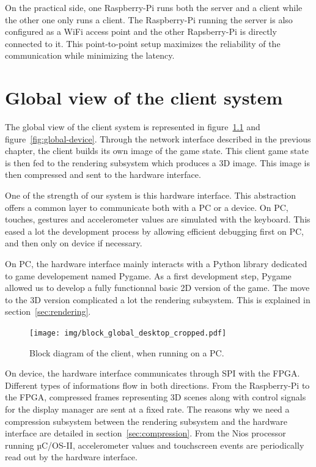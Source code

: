 \documentclass[english, DIV=13]{scrreprt}
\begin{document}
On the practical side, one Raspberry-Pi runs both the server and a client while the other
one only runs a client.
The Raspberry-Pi running the server is also configured as a WiFi access point and the other
Rapsberry-Pi is directly connected to it. This point-to-point setup maximizes the
reliability of the communication while minimizing the latency.

\chapter{Global view of the client system}
\label{chap:global-view}

The global view of the client system is represented in figure~\ref{fig:global-desktop}
and figure~\ref{fig:global-device}. Through the network interface described in the
previous chapter, the client builds its own image of the game state. This client game
state is then fed to the rendering subsystem which produces a 3D image. This image
is then compressed and sent to the hardware interface.

One of the strength of our system is this hardware interface. This abstraction offers
a common layer to communicate both with a PC or a device.
On PC, touches, gestures and accelerometer values are simulated with the keyboard.
This eased a lot the development process by allowing efficient debugging first on PC,
and then only on device if necessary.

On PC, the hardware interface mainly interacts with a Python library dedicated to game
developement named Pygame. As a first development step, Pygame allowed us to develop
a fully functionnal basic 2D version of the game. The move to the 3D version
complicated a lot the rendering subsystem. This is explained in
section~\ref{sec:rendering}.

\begin{figure}[bth]
    \centering
    \texttt{[image: img/block\_global\_desktop\_cropped.pdf]}
    \caption{Block diagram of the client, when running on a PC.}
    \label{fig:global-desktop}
\end{figure}

On device, the hardware interface communicates through SPI with the FPGA.
Different types of informations flow in both directions. From the Raspberry-Pi to the
FPGA, compressed frames representing 3D scenes along with control signals for the
display manager are sent at a fixed rate. The reasons why we need a compression
subsystem between the rendering subsystem and the hardware interface are detailed in
section~\ref{sec:compression}. From the Nios processor running µC/OS-II, accelerometer
values and touchscreen events are periodically read out by the hardware interface.
\end{document}
